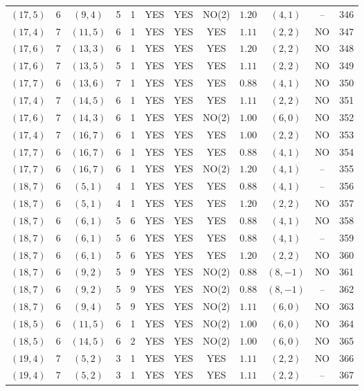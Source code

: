 \begin{longtable}{|c|c|c|c|c|c|c|c|c|c|c|c|}
$(17,5)$ & 6 & $(9,4)$ & 5 & 1 & YES & YES & NO(2) & $1.20$ & $(4,1)$ & -- & 346\\
$(17,4)$ & 7 & $(11,5)$ & 6 & 1 & YES & YES & YES & $1.11$ & $(2,2)$ & NO & 347\\
$(17,6)$ & 7 & $(13,3)$ & 6 & 1 & YES & YES & YES & $1.20$ & $(2,2)$ & NO & 348\\
$(17,6)$ & 7 & $(13,5)$ & 5 & 1 & YES & YES & YES & $1.11$ & $(2,2)$ & NO & 349\\
$(17,7)$ & 6 & $(13,6)$ & 7 & 1 & YES & YES & YES & $0.88$ & $(4,1)$ & NO & 350\\
$(17,4)$ & 7 & $(14,5)$ & 6 & 1 & YES & YES & YES & $1.11$ & $(2,2)$ & NO & 351\\
$(17,6)$ & 7 & $(14,3)$ & 6 & 1 & YES & YES & NO(2) & $1.00$ & $(6,0)$ & NO & 352\\
$(17,4)$ & 7 & $(16,7)$ & 6 & 1 & YES & YES & YES & $1.00$ & $(2,2)$ & NO & 353\\
$(17,7)$ & 6 & $(16,7)$ & 6 & 1 & YES & YES & YES & $0.88$ & $(4,1)$ & NO & 354\\
$(17,7)$ & 6 & $(16,7)$ & 6 & 1 & YES & YES & NO(2) & $1.20$ & $(4,1)$ & -- & 355\\
$(18,7)$ & 6 & $(5,1)$ & 4 & 1 & YES & YES & YES & $0.88$ & $(4,1)$ & -- & 356\\
$(18,7)$ & 6 & $(5,1)$ & 4 & 1 & YES & YES & YES & $1.20$ & $(2,2)$ & NO & 357\\
$(18,7)$ & 6 & $(6,1)$ & 5 & 6 & YES & YES & YES & $0.88$ & $(4,1)$ & NO & 358\\
$(18,7)$ & 6 & $(6,1)$ & 5 & 6 & YES & YES & YES & $0.88$ & $(4,1)$ & -- & 359\\
$(18,7)$ & 6 & $(6,1)$ & 5 & 6 & YES & YES & YES & $1.20$ & $(2,2)$ & NO & 360\\
$(18,7)$ & 6 & $(9,2)$ & 5 & 9 & YES & YES & NO(2) & $0.88$ & $(8,-1)$ & NO & 361\\
$(18,7)$ & 6 & $(9,2)$ & 5 & 9 & YES & YES & NO(2) & $0.88$ & $(8,-1)$ & -- & 362\\
$(18,7)$ & 6 & $(9,4)$ & 5 & 9 & YES & YES & NO(2) & $1.11$ & $(6,0)$ & NO & 363\\
$(18,5)$ & 6 & $(11,5)$ & 6 & 1 & YES & YES & NO(2) & $1.00$ & $(6,0)$ & NO & 364\\
$(18,5)$ & 6 & $(14,5)$ & 6 & 2 & YES & YES & NO(2) & $1.00$ & $(6,0)$ & NO & 365\\
$(19,4)$ & 7 & $(5,2)$ & 3 & 1 & YES & YES & YES & $1.11$ & $(2,2)$ & NO & 366\\
$(19,4)$ & 7 & $(5,2)$ & 3 & 1 & YES & YES & YES & $1.11$ & $(2,2)$ & -- & 367\\

\end{longtable}
